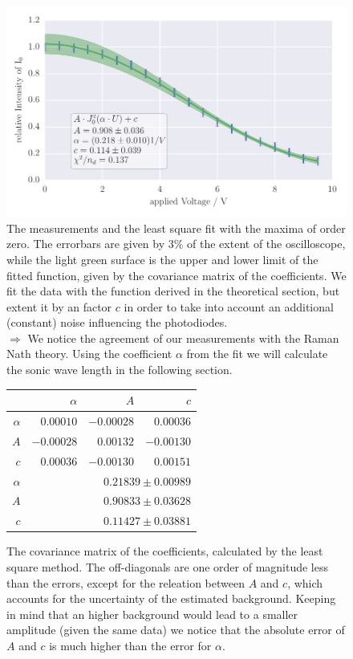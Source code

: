 \begin{figure}
    \centering
    \includegraphics[width=1\textwidth]{analysis/figures/besselfit_000}
    \caption{The measurements and the least square fit with the maxima of order zero. 
    The errorbars are given by 3\% of the extent of the oscilloscope,
    while the light green surface is the upper and lower limit of the fitted function, given
    by the covariance matrix of the coefficients. We fit the data with the function derived in the theoretical
    section, but extent it by an factor $c$ in order to take into account an additional (constant) noise
    influencing the photodiodes.\\
    $\Rightarrow$ We notice the agreement of our measurements with the Raman Nath theory. Using the
    coefficient $\alpha$ from the fit we will calculate the sonic wave length in the following section.}
    \label{fig:besselfit_000}
\end{figure}
\begin{figure}
\caption{
The covariance matrix of the coefficients, calculated by the least square method. The off-diagonals are
one order of magnitude less than the errors, except for the releation between $A$ and $c$, which accounts for the
uncertainty of the estimated background. Keeping in mind that an higher background would lead to a smaller
amplitude (given the same data) we notice that the absolute error of $A$ and $c$ is much higher than the error for $\alpha$.
}
 \begin{tabular}{|r|r|r|r|}
 \hline 
\cellcolor{tabcolor}&\cellcolor{tabcolor}$\alpha$&\cellcolor{tabcolor}$A$&\cellcolor{tabcolor}$c$\\ \hline 
 \cellcolor{tabcolor}$\alpha$&$0.00010$ &$-0.00028$ &$0.00036$ \\ 
\cellcolor{tabcolor}$A$&$-0.00028$ &$0.00132$ &$-0.00130$ \\ 
\cellcolor{tabcolor}$c$&$0.00036$ &$-0.00130$ &$0.00151$ \\ \hline \hline
\cellcolor{tabcolor}$\alpha$&\multicolumn{3}{r|}{$0.21839 \pm 0.00989$ }\\ 
\cellcolor{tabcolor}$A$&\multicolumn{3}{r|}{$0.90833 \pm 0.03628$ }\\ 
\cellcolor{tabcolor}$c$&\multicolumn{3}{r|}{$0.11427 \pm 0.03881$ }\\ 
\hline\end{tabular}
\end{figure}


